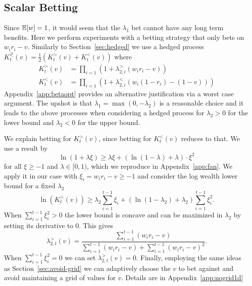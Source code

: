\subsection{Scalar Betting}
\label{sec:scalar}
Since $\mathbb{E}[w]=1$, it would seem that the $\lambda_1$ bet cannot have any long
term benefits. Here we perform experiments with a betting strategy that only
bets on $w_i r_i -v$.  Similarly to Section~\ref{sec:hedged} we use a hedged
process $K_t^{\gtrless}(v)=\frac{1}{2}\left(K_t^{>}(v)+K_t^{<}(v)\right)$ where
\begin{align*}
K_t^{>}(v)&=\prod_{i=1} \left(1+\lambda_{2,i}^{>} (w_i r_i -v)\right)\\
K_t^{<}(v)&=\prod_{i=1} \left(1+\lambda_{2,i}^{<} \left(w_i (1-r_i) -(1-v)\right)\right)
\end{align*}
Appendix~\ref{app:betaopt} provides an alternative justification via a worst
case argument.  The upshot is that $\lambda_1=\max(0,-\lambda_2)$ is a
reasonable choice and it leads to the above processes when considering a hedged
process for $\lambda_2>0$ for the lower bound and $\lambda_2<0$ for the upper
bound.

We explain betting for $K_t^{>}(v)$, since betting for $K_t^{<}(v)$ reduces to
that.  We use a result by \cite{fan2015exponential}
\[
\ln(1+\lambda \xi) \geq \lambda \xi+\left(\ln\left(1-\lambda\right)+\lambda\right)\cdot \xi^{2}
\]
for all $\xi\geq -1$ and $\lambda \in [0,1)$, which we reproduce in
Appendix~\ref{app:fan}.  We apply it in our case with $\xi_i=w_ir_i-v\geq -1$
and consider the log wealth lower bound for a fixed $\lambda_2$
\[
\ln(K_t^{>}(v)) \geq \lambda_2 \sum_{i=1}^{t-1} \xi_i + \left(\ln\left(1-\lambda_2\right)+\lambda_2\right) \sum_{i=1}^{t-1} \xi_i^2.
\]
When $\sum_{i=1}^{t-1} \xi_i^2>0$ the lower bound is concave and can 
be maximized in $\lambda_2$ by setting its derivative to 0. This gives
\[
\lambda_{2,t}^{>}(v) = \frac{\sum_{i=1}^{t-1} (w_i r_i -v)}{\sum_{i=1}^{t-1} (w_i r_i -v)+\sum_{i=1}^{t-1} (w_i r_i -v)^2}.
\]
When $\sum_{i=1}^{t-1} \xi_i^2=0$ we can set $\lambda_{2,t}^{>}(v)=0$.
Finally, employing the same ideas as Section~\ref{sec:avoid-grid} we can
adaptively choose the $v$ to bet against and avoid maintaining a grid of values
for $v$. Details are in Appendix~\ref{app:nogrid1d}

